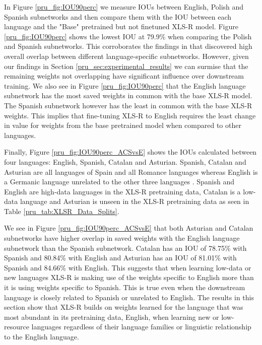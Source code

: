 In Figure \ref{pru_fig:IOU90perc} we measure IOUs between English, Polish and Spanish subnetworks and then compare them with the IOU between each language and the "Base" pretrained but not finetuned XLS-R model. Figure \ref{pru_fig:IOU90perc} shows the lowest IOU at 79.9\% when comparing the Polish and Spanish subnetworks. This corroborates the findings in \cite{PARP} that discovered high overall overlap between different language-specific subnetworks. However, given our findings in Section \ref{pru_sec:experimental_results} we can surmise that the remaining weights not overlapping have significant influence over downstream training. We also see in Figure \ref{pru_fig:IOU90perc} that the English language subnetwork has the most saved weights in common with the base XLS-R model. The Spanish subnetwork however has the least in common with the base XLS-R weights. This implies that fine-tuning XLS-R to English requires the least change in value for weights from the base pretrained model when compared to other languages. %

Finally, Figure \ref{pru_fig:IOU90perc_ACSvsE} shows the IOUs calculated between four languages: English, Spanish, Catalan and Asturian. Spanish, Catalan and Asturian are all languages of Spain and all Romance languages whereas English is a Germanic language unrelated to the other three languages \cite{bauer2007linguistics}. Spanish and English are high-data languages in the XLS-R pretraining data, Catalan is a low-data language and Asturian is unseen in the XLS-R pretraining data as seen in Table \ref{pru_tab:XLSR_Data_Splits}. 

We see in Figure \ref{pru_fig:IOU90perc_ACSvsE} that both Asturian and Catalan subnetworks have higher overlap in saved weights with the English language subnetwork than the Spanish subnetwork. Catalan has an IOU of 78.75\% with Spanish and 80.84\% with English and Asturian has an IOU of 81.01\% with Spanish and 84.66\% with English. This suggests that when learning low-data or new languages XLS-R is making use of the weights specific to English more than it is using weights specific to Spanish. This is true even when the downstream language is closely related to Spanish or unrelated to English. The results in this section show that XLS-R builds on weights learned for the language that was most abundant in its pretraining data, English, when learning new or low-resource languages regardless of their language families or linguistic relationship to the English language. 

